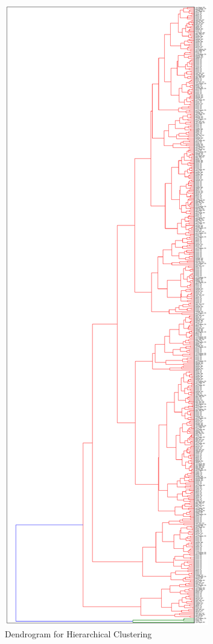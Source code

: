 \documentclass{article}
\begin{document}
\afterpage{\clearpage}
\begin{figure}[p]
\centering
\includegraphics[height=\textheight,width=\textwidth,keepaspectratio]{data/dendrogram.pdf}
\caption{Dendrogram for Hierarchical Clustering}
\label{fig:dendro}
\end{figure}

\newpage



\end{document}

